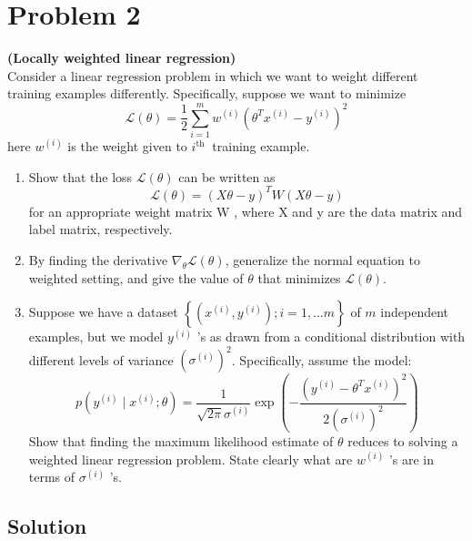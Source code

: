 \section*{Problem 2}

\textbf{(Locally weighted linear regression)}\\
Consider a linear regression problem in which we want to weight different training examples differently. Specifically, suppose we want to minimize
\[
    \mathcal{L}(\theta)=\frac{1}{2} \sum_{i=1}^{m} w^{(i)}\left(\theta^{T} x^{(i)}-y^{(i)}\right)^{2}
\]
here \( w^{(i)} \) is the weight given to \( i^{\text {th }} \) training example.\\
\begin{enumerate}[label= (\alph*), noitemsep, topsep=0pt]
    \item Show that the loss \( \mathcal{L}(\theta) \) can be written as
          \[
              \mathcal{L}(\theta)=(X \theta-y)^{T} W(X \theta-y)
          \]
          for an appropriate weight matrix W , where X and y are the data matrix and label matrix, respectively.

    \item  By finding the derivative \( \nabla_{\theta} \mathcal{L}(\theta) \), generalize the normal equation to weighted setting, and give the value of \( \theta \) that minimizes \( \mathcal{L}(\theta) \).

    \item  Suppose we have a dataset \( \left \{ \left(x^{(i)}, y^{(i)}\right) ; i=1, \ldots m\right \} \) of \( m \) independent examples, but we model \( y^{(i)} \) 's as drawn from a conditional distribution with different levels of variance \( \left(\sigma^{(i)}\right)^{2} \). Specifically, assume the model:
          \[
              p\left(y^{(i)} \mid x^{(i)} ; \theta\right)=\frac{1}{\sqrt{2 \pi} \sigma^{(i)}} \exp \left(-\frac{\left(y^{(i)}-\theta^{T} x^{(i)}\right)^{2}}{2\left(\sigma^{(i)}\right)^{2}}\right)
          \]
          Show that finding the maximum likelihood estimate of \( \theta \) reduces to solving a weighted linear regression problem. State clearly what are \( w^{(i)} \) 's are in terms of \( \sigma^{(i)} \) 's.
\end{enumerate}

\subsection*{Solution}

